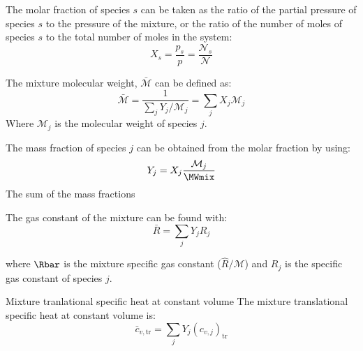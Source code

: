 \documentclass[10pt]{article}
\begin{document}
\begin{flushleft}
\begin{definition}
The molar fraction of species $s$ can be taken as the ratio of the partial pressure of species $s$ to the pressure of the mixture, or the ratio of the number of moles of species $s$ to the total number of moles in the system:
\begin{equation}
    X_s = \frac{p_s}{p} = \frac{\mathcal{N}_s}{\mathcal{N}}
\end{equation}
\label{def:Xmol}
\end{definition}

\begin{definition}
The mixture molecular weight, $\bar{\mathcal{M}}$ can be defined as:
\begin{equation}
    \bar{\mathcal{M}} = \frac{1}{\sum_j Y_j / \mathcal{M}_j} = \sum_j X_j \mathcal{M}_j
\end{equation}
Where $\mathcal{M}_j$ is the molecular weight of species $j$.
\label{def:MWmix}
\end{definition}

\begin{definition} 
The mass fraction of species $j$ can be obtained from the molar fraction by using:
\begin{equation}
    Y_j = X_j \frac{\mathcal{M}_j}{\MWmix}
\end{equation}
The sum of the mass fractions
\end{definition}

\begin{definition}
    The gas constant of the mixture can be found with:
    \begin{equation}
        \bar{R} = \sum_j Y_j R_j
        \label{def:Rbar}
    \end{equation}

    where $\Rbar$ is the mixture specific gas constant ($\hat{R}/\mathcal{M}$) and $R_j$ is the specific gas constant of species $j$.
\end{definition}

\begin{definition} {Mixture tranlational specific heat at constant volume}
    The mixture translational specific heat at constant volume is:
    \begin{equation}
        \bar{c}_{v,\text{tr}} = \sum_j Y_j (c_{v,j})_\text{tr}
    \end{equation}
    \label{def:cvbar}
\end{definition}


\end{flushleft}
\end{document}
